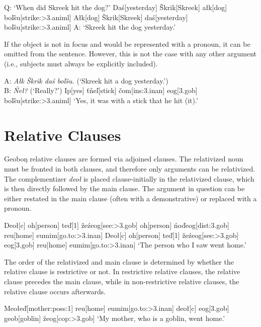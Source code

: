 \documentclass[a4paper,11pt,oneside,openany]{memoir}
\newcommand{\vt}{ť}
\newcommand{\vd}{ď}
\newcommand{\vc}{č}
\newcommand{\vz}{ž}
\newcommand{\vs}{š}
\newcommand{\vl}{ľ}
\newcommand{\vn}{ň}
\newcommand{\vS}{Š}
\newcommand{\engma}{ŋ}
\begin{document}
\pex Q: `When did Skreek hit the dog?'
\a \ljudge*
\begingl
Da\'s[yesterday]
\vS krik[Skreek]
a\l k[dog]
bo\vl\vs u[strike:{\sc >3.animl}]
\endgl
\a 
\begingl
A\l k[dog]
\vS krik[Skreek] 
da\'s[yesterday]
bo\vl\vs u[strike:{\sc >3.animl}]
\glft A: `Skreek hit the dog yesterday.'
\endgl
\xe

If the object is not in focus and would be represented with a pronoun, it can be omitted from the sentence. However, this is not the case with any other argument (i.e., subjects must always be explicitly included).

\ex
\begingl
\glpreamble A: \textit{A\l k \vS krik da\'s bo\vl\vs u.} (`Skreek hit a dog yesterday.')\\B: \textit{\'Ne\l?} (`Really?')\endpreamble
Ip[yes]
\vt\vn e{\vl}[stick]
\vc om[\sc ins:3.inan]
eog[{\sc 3.gob}]
bo\vl\vs u[strike:{\sc >3.animl}]
\glft `Yes, it was with a stick that he hit (it).'
\endgl
\xe

\section{Relative Clauses}

Geobo{\engma} relative clauses are formed via adjoined clauses. The relativized noun must be fronted in both clauses, and therefore only arguments can be relativized. The complementizer \textit{deo\l} is placed clause-initially in the relativized clause, which is then directly followed by the main clause. The argument in question can be either restated in the main clause (often with a demonstrative) or replaced with a pronoun.

\pex
\a
\begingl
Deo{\l}[{\sc c}]
oh[person]
te{\vd}[1]
\vz e\'zeog[see:{\sc >3.gob}]
\nogloss{,}
oh[person]
\'no\vd eog[{\sc dist:3.gob}]
reu[home]
eumim[go.to:{\sc >3.inan}]
\endgl
\a
\begingl
Deo{\l}[{\sc c}]
oh[person]
te{\vd}[1]
\vz e\'zeog[see:{\sc >3.gob}]
eog[{\sc 3.gob}]
reu[home]
eumim[go.to:{\sc >3.inan}]
\glft `The person who I saw went home.'
\endgl
\xe

The order of the relativized and main clause is determined by whether the relative clause is restrictive or not. In restrictive relative clauses, the relative clause precedes the main clause, while in non-restrictive relative clauses, the relative clause occurs afterwards.

\ex
\begingl
Meo\l e\vd[mother:{\sc poss:1}]
reu[home]
eumim[go.to:{\sc >3.inan}]
\nogloss{,}
deo{\l}[{\sc c}]
eog[{\sc 3.gob}]
geob[goblin]
\vz eog[\sc cop:>3.gob]
\glft `My mother, who is a goblin, went home.'
\endgl
\xe
\end{document}
